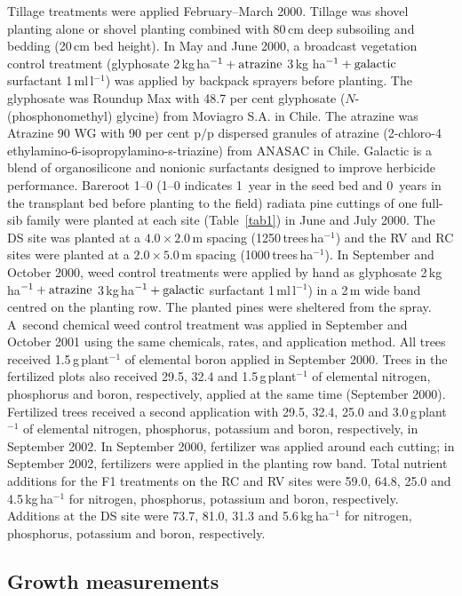\documentclass[final]{foresj}
\begin{document}
Tillage treatments were applied February--March 2000.
Tillage was shovel planting alone or shovel planting
combined with 80\,cm deep subsoiling and bedding (20\,cm
bed height). In May and June 2000, a broadcast vegetation
control treatment (glyphosate 2\,kg\,ha$^{-1} +
\hbox{atrazine}$ 3\,kg ha$^{-1} +\hbox{galactic}$
surfactant 1\,ml\,l$^{-1}$) was applied by backpack
sprayers before planting. The glyphosate was Roundup Max
with 48.7 per cent glyphosate ($N$-(phosphonomethyl)
glycine) from Moviagro S.A. in Chile. The atrazine was
Atrazine 90 WG with 90 per cent p$/$p dispersed granules of
atrazine (2-chloro-4
ethylamino-6-isopropylamino-s-triazine) from ANASAC in
Chile. Galactic is a blend of organosilicone and nonionic
surfactants designed to improve herbicide performance.
Bareroot 1--0 (1--0 indicates 1~year in the seed bed and
0~years in the transplant bed before planting to the field)
radiata pine cuttings of one full-sib family were planted
at each site (Table~\ref{tab1}) in June and July 2000. The
DS site was planted at a $4.0\times 2.0$\,m spacing
(1250\,trees\,ha$^{-1}$) and the RV and RC sites were
planted at a $2.0\times 5.0$\,m spacing
(1000\,trees\,\hbox{ha}$^{-1}$). In September and October
2000, weed control treatments were applied by hand as
glyphosate 2\,kg\,ha$^{-1} +\hbox{atrazine}$
3\,kg\,ha$^{-1} +\hbox{galactic}$ surfactant
1\,ml\,l$^{-1}$) in a 2\,m wide band centred on the
planting row. The planted pines were sheltered from the
spray. A~second chemical weed control treatment was applied
in September and October 2001 using the same chemicals,
rates, and application method. All trees received
1.5\,g\,plant$^{-1}$ of elemental boron applied in
September 2000. Trees in the fertilized plots also received
29.5, 32.4 and 1.5\,g\,plant$^{-1}$ of elemental nitrogen,
phosphorus and boron, respectively, applied at the same
time (September 2000). Fertilized trees received a second
application with 29.5, 32.4, 25.0 and 3.0\,g\,plant$^{-1}$
of elemental nitrogen, phosphorus, potassium and boron,
respectively, in September 2002. In September 2000,
fertilizer was applied around each cutting; in September
2002, fertilizers were applied in the planting row band.
Total nutrient additions for the F1 treatments on the RC
and RV sites were 59.0, 64.8, 25.0 and 4.5\,kg\,ha$^{-1}$
for nitrogen, phosphorus, potassium and boron,
respectively. Additions at the DS site were 73.7, 81.0,
31.3 and 5.6\,kg\,ha$^{-1}$ for nitrogen, phosphorus,
potassium and boron, respectively.

\subsection{Growth measurements}
\end{document}
